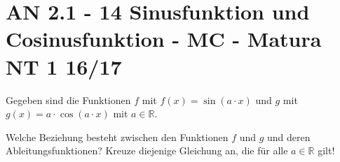 \section{AN 2.1 - 14 Sinusfunktion und Cosinusfunktion - MC - Matura NT 1 16/17}

\begin{beispiel}[AN 2.1]{1} %
Gegeben sind die Funktionen $f$ mit $f(x)=\sin(a\cdot x)$ und $g$ mit $g(x)=a\cdot\cos(a\cdot x)$ mit $a\in\mathbb{R}$.

Welche Beziehung besteht zwischen den Funktionen $f$ und $g$ und deren Ableitungsfunktionen? Kreuze diejenige Gleichung an, die für alle $a\in\mathbb{R}$ gilt!

\end{beispiel}
